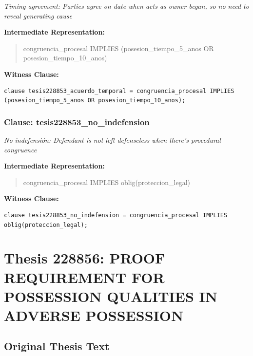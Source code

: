\documentclass[11pt,a4paper]{article}
\begin{document}
\textit{Timing agreement: Parties agree on date when acts as owner began, so no need to reveal generating cause}

\textbf{Intermediate Representation:}

\begin{quote}
congruencia\_procesal IMPLIES (posesion\_tiempo\_5\_anos OR posesion\_tiempo\_10\_anos)
\end{quote}

\textbf{Witness Clause:}

\begin{lstlisting}[style=witnessstyle, language=Witness]
clause tesis228853_acuerdo_temporal = congruencia_procesal IMPLIES (posesion_tiempo_5_anos OR posesion_tiempo_10_anos);
\end{lstlisting}

\subsubsection{Clause: tesis228853\_no\_indefension}

\textit{No indefensión: Defendant is not left defenseless when there's procedural congruence}

\textbf{Intermediate Representation:}

\begin{quote}
congruencia\_procesal IMPLIES oblig(proteccion\_legal)
\end{quote}

\textbf{Witness Clause:}

\begin{lstlisting}[style=witnessstyle, language=Witness]
clause tesis228853_no_indefension = congruencia_procesal IMPLIES oblig(proteccion_legal);
\end{lstlisting}

\newpage

\section{Thesis 228856: PROOF REQUIREMENT FOR POSSESSION QUALITIES IN ADVERSE POSSESSION}
\label{thesis:228856}

\subsection{Original Thesis Text}
\end{document}
